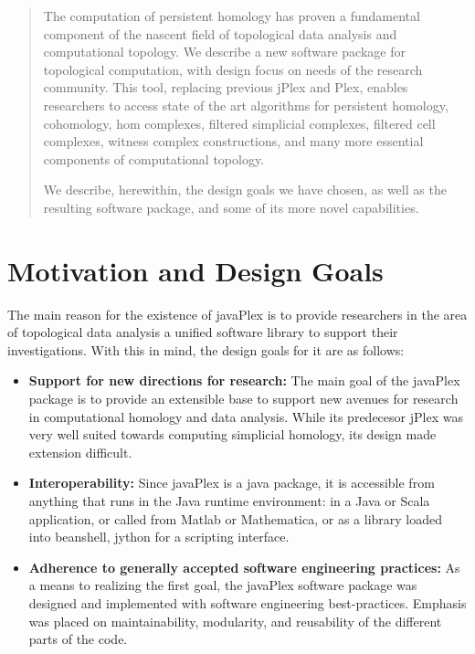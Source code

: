 \begin{abstract}
The computation of persistent homology has proven a fundamental component of the nascent field of topological data analysis and computational topology. We describe a new software package for topological computation, with design focus on needs of the research community. This tool, replacing previous jPlex and Plex, enables researchers to access state of the art algorithms for persistent homology, cohomology, hom complexes, filtered simplicial complexes, filtered cell complexes, witness complex constructions, and many more essential components of computational topology.

We describe, herewithin, the design goals we have chosen, as well as the resulting software package, and some of its more novel capabilities.

\end{abstract}

\section{Motivation and Design Goals}

The main reason for the existence of javaPlex is to provide researchers in the area of topological data analysis a unified software library to support their investigations. With this in mind, the design goals for it are as follows:

\begin{itemize}
\item {\bf Support for new directions for research: } The main goal of the javaPlex package is to provide an extensible base to support new avenues for research in computational homology and data analysis. While its predecesor jPlex was very well suited towards computing simplicial homology, its design made extension difficult.
\item {\bf Interoperability: } Since javaPlex is a java package, it is
  accessible from anything that runs in the Java runtime environment:
  in a Java or Scala application, or called from Matlab or Mathematica, or as a
  library loaded into beanshell, jython for a scripting interface.
\item {\bf Adherence to generally accepted software engineering practices: } As a means to realizing the first goal, the javaPlex software package was designed and implemented with software engineering best-practices. Emphasis was placed on maintainability, modularity, and reusability of the different parts of the code.
\end{itemize}

